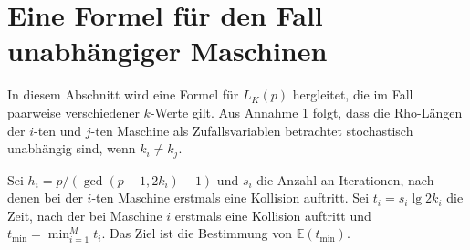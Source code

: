 \documentclass[a4paper, 10pt, ngerman]{article}
\newcommand{\E}{\mathbb{E}}
\begin{document}
\section{Eine Formel für den Fall unabhängiger Maschinen}

In diesem Abschnitt wird eine Formel für $L_K(p)$ hergleitet, die im Fall paarweise verschiedener $k$-Werte gilt. Aus Annahme 1 folgt, dass die Rho-Längen der $i$-ten und $j$-ten Maschine als Zufallsvariablen betrachtet stochastisch unabhängig sind, wenn $k_i \ne k_j$.

Sei $h_i = p/(\gcd(p - 1, 2k_i) - 1)$ und $s_i$ die Anzahl an Iterationen, nach denen bei der $i$-ten Maschine erstmals eine Kollision auftritt. Sei $t_i = s_i \lg 2k_i$ die Zeit, nach der bei Maschine $i$ erstmals eine Kollision auftritt und $t_{\min} = \min_{i = 1}^M t_i$. Das Ziel ist die Bestimmung von $\E(t_{\min})$.
\end{document}
